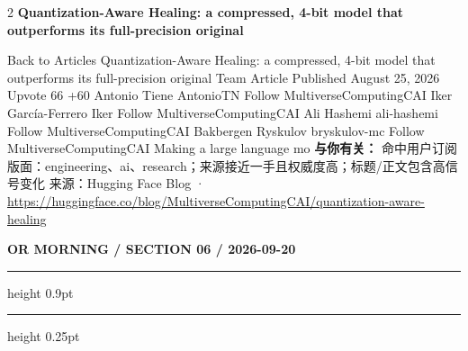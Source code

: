 \documentclass[10.5pt]{ctexart}
\begin{document}
\begin{multicols}{2}
\vspace{2mm}
{\large\bfseries Quantization-Aware Healing: a compressed, 4-bit model that outperforms its full-precision original}\par
Back to Articles Quantization-Aware Healing: a compressed, 4-bit model that outperforms its full-precision original Team Article Published August 25, 2026 Upvote 66 +60 Antonio Tiene AntonioTN Follow MultiverseComputingCAI Iker García-Ferrero Iker Follow MultiverseComputingCAI Ali Hashemi ali-hashemi Follow MultiverseComputingCAI Bakbergen Ryskulov bryskulov-mc Follow MultiverseComputingCAI Making a large language mo
\textbf{与你有关：} 命中用户订阅版面：engineering、ai、research；来源接近一手且权威度高；标题/正文包含高信号变化
{\footnotesize\color{ormuted} 来源：Hugging Face Blog · \url{https://huggingface.co/blog/MultiverseComputingCAI/quantization-aware-healing}}
\end{multicols}
\newpage
{\small\bfseries OR MORNING / SECTION 06 / 2026-09-20}
\vspace{2mm}
\hrule height 0.9pt
\vspace{1.5mm}
\hrule height 0.25pt
\vspace{4mm}
\end{document}
